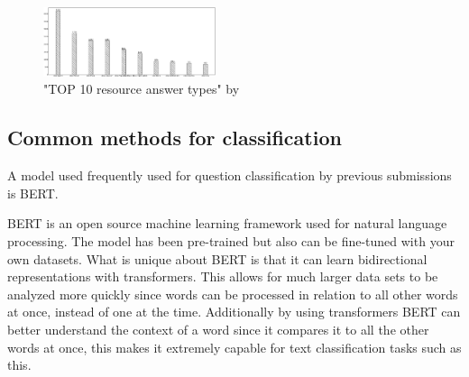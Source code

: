 \documentclass[sigconf]{acmart}
\begin{document}
\begin{figure}[h]
    \includegraphics[width=0.45\textwidth]{figures/top10ResourceAnswerTypes.png}
    \caption{"TOP 10 resource answer types" by \citet{Kothen:analysis}}
    \label{figure:top10resourceanswertypes}
\end{figure}

\subsection{Common methods for classification}
A model used frequently used for question classification by previous submissions is \gls{BERT}\cite{maastricht:bert, heraklion:bert, tokyo:bert, uis:bert, Kothen:analysis}. 

\gls{BERT} is an open source machine learning framework used for natural language processing. The model has been pre-trained but also can be fine-tuned with your own datasets. What is unique about BERT is that it can learn bidirectional representations with transformers. This allows for much larger data sets to be analyzed more quickly since words can be processed in relation to all other words at once, instead of one at the time. Additionally by using transformers \gls{BERT} can better understand the context of a word since it compares it to all the other words at once, this makes it extremely capable for text classification tasks such as this.\cite{nvidia:bert}



\end{document}
